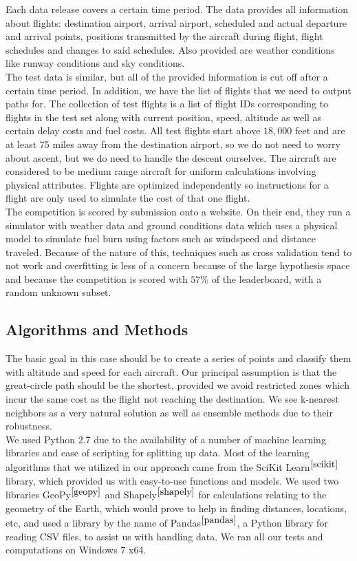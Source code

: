 \documentclass{article}[12pt]
\begin{document}
\begin{multicols}{2}
Each data release covers a certain time period. The data provides all information about flights: destination airport, arrival airport, scheduled and actual departure and arrival points, positions transmitted by the aircraft during flight, flight schedules and changes to said schedules. Also provided are weather conditions like runway conditions and sky conditions. \\

The test data is similar, but all of the provided information is cut off after a certain time period. In addition, we have the list of flights that we need to output paths for. The collection of test flights is a list of flight IDs corresponding to flights in the test set along with current position, speed, altitude as well as certain delay costs and fuel costs. All test flights start above $18,000$ feet and are at least 75 miles away from the destination airport, so we do not need to worry about ascent, but we do need to handle the descent ourselves. The aircraft are considered to be medium range aircraft for uniform calculations involving physical attributes. Flights are optimized independently so instructions for a flight are only used to simulate the cost of that one flight. \\

The competition is scored by submission onto a website. On their end, they run a simulator with weather data and ground conditions data which uses a physical model to simulate fuel burn using factors such as windspeed and distance traveled. Because of the nature of this, techniques such as cross validation tend to not work and overfitting is less of a concern because of the large hypothesis space and because the competition is scored with $57\%$ of the leaderboard, with a random unknown subset.
\subsection{Algorithms and Methods}

The basic goal in this case should be to create a series of points and classify them with altitude and speed for each aircraft. Our principal assumption is that the great-circle path should be the shortest, provided we avoid restricted zones which incur the same cost as the flight not reaching the destination. We see k-nearest neighbors as a very natural solution as well as ensemble methods due to their robustness.\\

We used Python 2.7 due to the availability of a number of machine learning libraries and ease of scripting for splitting up data. Most of the learning algorithms that we utilized in our approach came from the SciKit Learn$^{\cite{scikit}}$ library, which provided us with easy-to-use functions and models. We used two libraries GeoPy$^{\cite{geopy}}$ and Shapely$^{\cite{shapely}}$ for calculations relating to the geometry of the Earth, which would prove to help in finding distances, locations, etc, and used a library by the name of Pandas$^{\cite{pandas}}$, a Python library for reading CSV files, to assist us with handling data. We ran all our tests and computations on Windows 7 x64.


\end{multicols}
\end{document}
